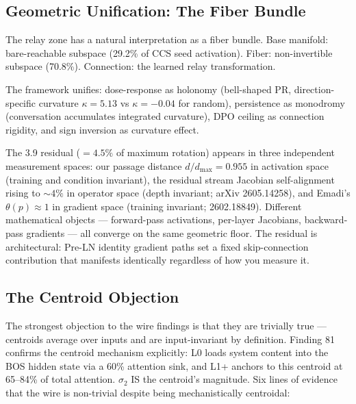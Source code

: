 \documentclass[12pt]{article}
\begin{document}
\subsection{Geometric Unification: The Fiber Bundle}

The relay zone has a natural interpretation as a fiber bundle. Base manifold: bare-reachable subspace (29.2\% of CCS seed activation). Fiber: non-invertible subspace (70.8\%). Connection: the learned relay transformation.

The framework unifies: dose-response as holonomy (bell-shaped PR, direction-specific curvature $\kappa = 5.13$ vs $\kappa = -0.04$ for random), persistence as monodromy (conversation accumulates integrated curvature), DPO ceiling as connection rigidity, and sign inversion as curvature effect.

The 3.9\textdegree{} residual ($= 4.5\%$ of maximum rotation) appears in three independent measurement spaces: our passage distance $d/d_{\max} = 0.955$ in activation space (training and condition invariant), the residual stream Jacobian self-alignment rising to ${\sim}4\%$ in operator space (depth invariant; arXiv 2605.14258), and Emadi's $\theta(p) \approx 1$ in gradient space (training invariant; 2602.18849). Different mathematical objects --- forward-pass activations, per-layer Jacobians, backward-pass gradients --- all converge on the same geometric floor. The residual is architectural: Pre-LN identity gradient paths set a fixed skip-connection contribution that manifests identically regardless of how you measure it.

\subsection{The Centroid Objection}

The strongest objection to the wire findings is that they are trivially true --- centroids average over inputs and are input-invariant by definition. Finding 81 confirms the centroid mechanism explicitly: L0 loads system content into the BOS hidden state via a 60\% attention sink, and L1+ anchors to this centroid at 65--84\% of total attention. $\sigma_2$ IS the centroid's magnitude. Six lines of evidence that the wire is non-trivial despite being mechanistically centroidal:
\end{document}
